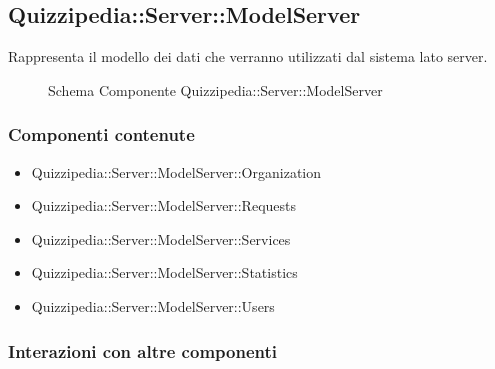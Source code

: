 \subsection{Quizzipedia::Server::ModelServer}
Rappresenta il modello dei dati che verranno utilizzati dal sistema lato server.
\begin{figure}[H]
\centering
\noindent{}
\caption[Schema Componente Quizzipedia::Server::ModelServer]{Schema Componente Quizzipedia::Server::ModelServer}
\end{figure}
\subsubsection{Componenti contenute}
\begin{itemize}
\item Quizzipedia::Server::ModelServer::Organization
\item Quizzipedia::Server::ModelServer::Requests
\item Quizzipedia::Server::ModelServer::Services
\item Quizzipedia::Server::ModelServer::Statistics
\item Quizzipedia::Server::ModelServer::Users
\end{itemize}
\subsubsection{Interazioni con altre componenti}
